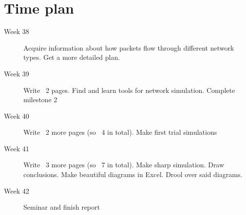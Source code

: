 \documentclass[10pt,a4paper]{article}
\begin{document}
\section{Time plan}
\begin{description}
\item[Week 38]
Acquire information about how packets flow through different network types. Get a more detailed plan.
\item[Week 39]
Write ~2 pages. Find and learn tools for network simulation. Complete milestone 2
\item[Week 40]
Write ~2 more pages (so ~4 in total). Make first trial simulations
\item[Week 41]
Write ~3 more pages (so ~7 in total). Make sharp simulation. Draw conclusions. Make beautiful diagrams in Excel. Drool over said diagrams.
\item[Week 42]
Seminar and finish report
\end{description}
\end{document}

